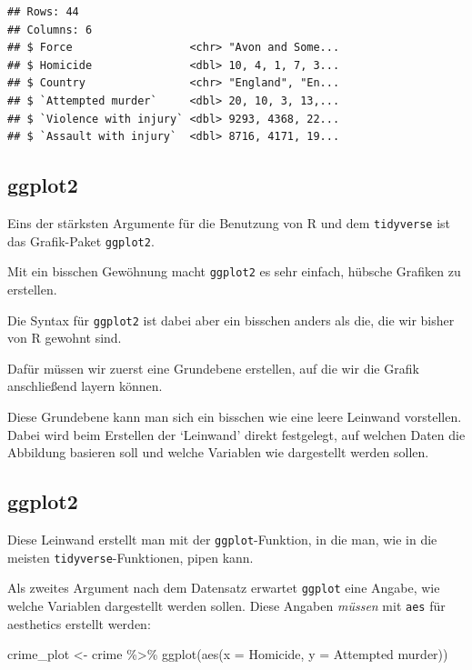 \documentclass[
]{book}
\newenvironment{Shaded}{\begin{snugshade}}{\end{snugshade}}
\newcommand{\AttributeTok}[1]{\textcolor[rgb]{0.77,0.63,0.00}{#1}}
\newcommand{\FunctionTok}[1]{\textcolor[rgb]{0.00,0.00,0.00}{#1}}
\newcommand{\NormalTok}[1]{#1}
\newcommand{\OtherTok}[1]{\textcolor[rgb]{0.56,0.35,0.01}{#1}}
\newcommand{\SpecialCharTok}[1]{\textcolor[rgb]{0.00,0.00,0.00}{#1}}
\newcommand{\StringTok}[1]{\textcolor[rgb]{0.31,0.60,0.02}{#1}}
\begin{document}
\begin{verbatim}
## Rows: 44
## Columns: 6
## $ Force                  <chr> "Avon and Some...
## $ Homicide               <dbl> 10, 4, 1, 7, 3...
## $ Country                <chr> "England", "En...
## $ `Attempted murder`     <dbl> 20, 10, 3, 13,...
## $ `Violence with injury` <dbl> 9293, 4368, 22...
## $ `Assault with injury`  <dbl> 8716, 4171, 19...
\end{verbatim}

\hypertarget{ggplot2}{%
\subsection{ggplot2}\label{ggplot2}}

Eins der stärksten Argumente für die Benutzung von R und dem \texttt{tidyverse} ist das Grafik-Paket \texttt{ggplot2}.

Mit ein bisschen Gewöhnung macht \texttt{ggplot2} es sehr einfach, hübsche Grafiken zu erstellen.

Die Syntax für \texttt{ggplot2} ist dabei aber ein bisschen anders als die, die wir bisher von R gewohnt sind.

Dafür müssen wir zuerst eine Grundebene erstellen, auf die wir die Grafik anschließend layern können.

Diese Grundebene kann man sich ein bisschen wie eine leere Leinwand vorstellen.
Dabei wird beim Erstellen der `Leinwand' direkt festgelegt, auf welchen Daten die Abbildung basieren soll und welche Variablen wie dargestellt werden sollen.

\hypertarget{ggplot2-1}{%
\subsection{ggplot2}\label{ggplot2-1}}

Diese Leinwand erstellt man mit der \texttt{ggplot}-Funktion, in die man, wie in die meisten \texttt{tidyverse}-Funktionen, pipen kann.

Als zweites Argument nach dem Datensatz erwartet \texttt{ggplot} eine Angabe, wie welche Variablen dargestellt werden sollen. Diese Angaben \emph{müssen} mit \texttt{aes} für aesthetics erstellt werden:

\begin{Shaded}
\begin{Highlighting}[]
\NormalTok{crime\_plot }\OtherTok{\textless{}{-}}\NormalTok{ crime }\SpecialCharTok{\%\textgreater{}\%} 
  \FunctionTok{ggplot}\NormalTok{(}\FunctionTok{aes}\NormalTok{(}\AttributeTok{x =}\NormalTok{ Homicide, }\AttributeTok{y =} \StringTok{\textasciigrave{}}\AttributeTok{Attempted murder}\StringTok{\textasciigrave{}}\NormalTok{))}
\end{Highlighting}
\end{Shaded}
\end{document}
